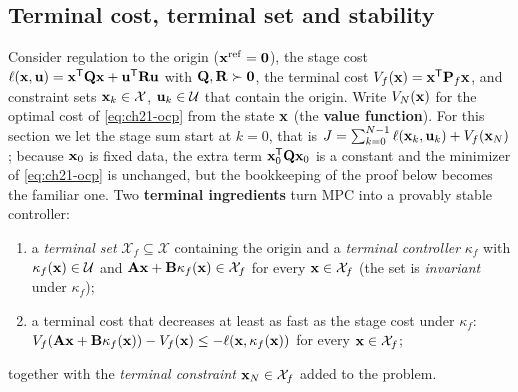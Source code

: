 \subsection{Terminal cost, terminal set and stability}

Consider regulation to the origin ($\mathbf{x}^{\mathrm{ref}}=\mathbf{0}$), the
stage cost $\ell(\mathbf{x},\mathbf{u})=\mathbf{x}^{\mathsf{T}}\mathbf{Q}\mathbf{x}+\mathbf{u}^{\mathsf{T}}\mathbf{R}\mathbf{u}$ with
$\mathbf{Q},\mathbf{R}\succ\mathbf{0}$, the terminal cost $V_f(\mathbf{x})=\mathbf{x}^{\mathsf{T}}\mathbf{P}_f\mathbf{x}$,
and constraint sets $\mathbf{x}_k\in\mathcal{X}$, $\mathbf{u}_k\in\mathcal{U}$ that contain
the origin. Write $V_N(\mathbf{x})$ for the optimal cost of \cref{eq:ch21-ocp}
from the state $\mathbf{x}$ (the \textbf{value function}).
For this section we let the stage sum start at $k=0$, that is
$J=\sum_{k=0}^{N-1}\ell(\mathbf{x}_k,\mathbf{u}_k)+V_f(\mathbf{x}_N)$; because $\mathbf{x}_0$
is fixed data, the extra term $\mathbf{x}_0^{\mathsf{T}}\mathbf{Q}\mathbf{x}_0$ is a constant and the
minimizer of \cref{eq:ch21-ocp} is unchanged, but the bookkeeping of the proof
below becomes the familiar one.
Two \textbf{terminal ingredients}
turn MPC into a provably stable controller:
\begin{enumerate}[label=(\roman*)]
  \item a \emph{terminal set} $\mathcal{X}_f\subseteq\mathcal{X}$ containing the
  origin and a \emph{terminal controller} $\kappa_f$ with
  $\kappa_f(\mathbf{x})\in\mathcal{U}$ and
  $\mathbf{A}\mathbf{x}+\mathbf{B}\kappa_f(\mathbf{x})\in\mathcal{X}_f$ for every
  $\mathbf{x}\in\mathcal{X}_f$ (the set is \emph{invariant} under $\kappa_f$);
  \item a terminal cost that decreases at least as fast as the stage cost
  under $\kappa_f$: $V_f(\mathbf{A}\mathbf{x}+\mathbf{B}\kappa_f(\mathbf{x}))-V_f(\mathbf{x})\le-\ell(\mathbf{x},\kappa_f(\mathbf{x}))$
  for every $\mathbf{x}\in\mathcal{X}_f$;
\end{enumerate}
together with the \emph{terminal constraint} $\mathbf{x}_N\in\mathcal{X}_f$ added to
the problem.

